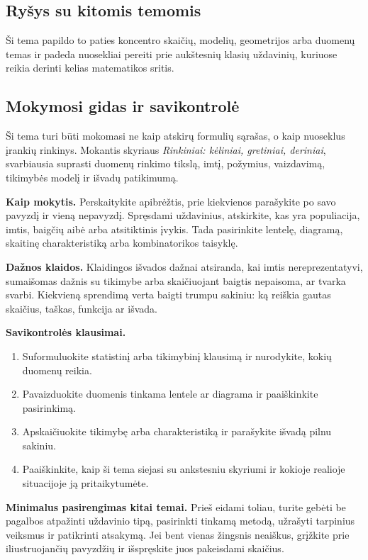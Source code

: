 \subsection{Ryšys su kitomis temomis}
Ši tema papildo to paties koncentro skaičių, modelių, geometrijos arba duomenų temas ir padeda nuosekliai pereiti prie aukštesnių klasių uždavinių, kuriuose reikia derinti kelias matematikos sritis.

\subsection{Mokymosi gidas ir savikontrolė}

Ši tema turi būti mokomasi ne kaip atskirų formulių sąrašas, o kaip nuoseklus įrankių rinkinys. Mokantis skyriaus \textit{Rinkiniai: kėliniai, gretiniai, deriniai}, svarbiausia suprasti duomenų rinkimo tikslą, imtį, požymius, vaizdavimą, tikimybės modelį ir išvadų patikimumą.

\textbf{Kaip mokytis.} Perskaitykite apibrėžtis, prie kiekvienos parašykite po savo pavyzdį ir vieną nepavyzdį. Spręsdami uždavinius, atskirkite, kas yra populiacija, imtis, baigčių aibė arba atsitiktinis įvykis. Tada pasirinkite lentelę, diagramą, skaitinę charakteristiką arba kombinatorikos taisyklę.

\textbf{Dažnos klaidos.} Klaidingos išvados dažnai atsiranda, kai imtis nereprezentatyvi, sumaišomas dažnis su tikimybe arba skaičiuojant baigtis nepaisoma, ar tvarka svarbi. Kiekvieną sprendimą verta baigti trumpu sakiniu: ką reiškia gautas skaičius, taškas, funkcija ar išvada.

\textbf{Savikontrolės klausimai.}
\begin{enumerate}[label=\arabic*.]
\item Suformuluokite statistinį arba tikimybinį klausimą ir nurodykite, kokių duomenų reikia.
\item Pavaizduokite duomenis tinkama lentele ar diagrama ir paaiškinkite pasirinkimą.
\item Apskaičiuokite tikimybę arba charakteristiką ir parašykite išvadą pilnu sakiniu.
\item Paaiškinkite, kaip ši tema siejasi su ankstesniu skyriumi ir kokioje realioje situacijoje ją pritaikytumėte.
\end{enumerate}

\textbf{Minimalus pasirengimas kitai temai.} Prieš eidami toliau, turite gebėti be pagalbos atpažinti uždavinio tipą, pasirinkti tinkamą metodą, užrašyti tarpinius veiksmus ir patikrinti atsakymą. Jei bent vienas žingsnis neaiškus, grįžkite prie iliustruojančių pavyzdžių ir išspręskite juos pakeisdami skaičius.
